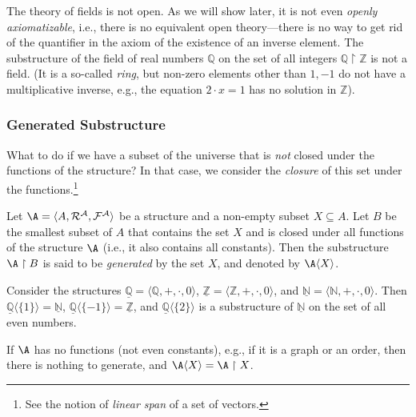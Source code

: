 \begin{example}
    The theory of fields is not open. As we will show later, it is not even \emph{openly axiomatizable}, i.e., there is no equivalent open theory---there is no way to get rid of the quantifier in the axiom of the existence of an inverse element. The substructure of the field of real numbers $\mathbb Q$ on the set of all integers $\mathbb Q\restriction\mathbb Z$ is not a field. (It is a so-called \emph{ring}, but non-zero elements other than $1,-1$ do not have a multiplicative inverse, e.g., the equation $2\cdot x=1$ has no solution in $\mathbb Z$).
\end{example}

\subsubsection{Generated Substructure}

What to do if we have a subset of the universe that is \emph{not} closed under the functions of the structure? In that case, we consider the \emph{closure} of this set under the functions.\footnote{See the notion of \emph{linear span} of a set of vectors.}

\begin{definition}
    Let $\A=\langle A,\mathcal R^\mathcal A,\mathcal F^\mathcal A\rangle$ be a structure and a non-empty subset $X\subseteq A$. Let $B$ be the smallest subset of $A$ that contains the set $X$ and is closed under all functions of the structure $\A$ (i.e., it also contains all constants). Then the substructure $\A\restriction B$ is said to be \emph{generated} by the set $X$, and denoted by $\A\langle X\rangle$.
\end{definition}

\begin{example}
    Consider the structures $\underline{\mathbb Q}=\langle\mathbb Q,+,\cdot,0\rangle$, $\underline{\mathbb Z}=\langle\mathbb Z,+,\cdot,0\rangle$, and $\underline{\mathbb N}=\langle\mathbb N,+,\cdot,0\rangle$. Then $\underline{\mathbb Q}\langle\{1\}\rangle=\underline{\mathbb N}$, $\underline{\mathbb Q}\langle\{-1\}\rangle=\underline{\mathbb Z}$, and $\underline{\mathbb Q}\langle\{2\}\rangle$ is a substructure of $\underline{\mathbb N}$ on the set of all even numbers.
\end{example}

\begin{example}
    If $\A$ has no functions (not even constants), e.g., if it is a graph or an order, then there is nothing to generate, and $\A\langle X\rangle=\A\restriction X$.
\end{example}

